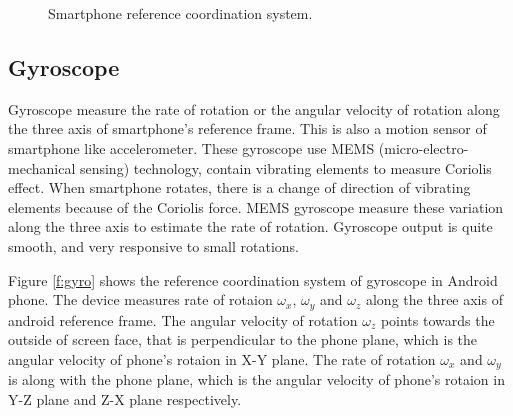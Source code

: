 \begin{figure}[!ht]
\centering
{}
\hfill
{}

\caption{Smartphone reference coordination system.}
\label{f:coord_dia}
\end{figure}

\subsection{Gyroscope}
Gyroscope measure the rate of rotation or the angular velocity of rotation along the three axis of smartphone's reference frame.
This is also a motion sensor of smartphone like accelerometer.
These gyroscope use MEMS (micro-electro-mechanical sensing) technology, contain vibrating elements to measure Coriolis effect.
When smartphone rotates, there is a change of direction of vibrating elements because of the Coriolis force.
MEMS gyroscope measure these variation along the three axis to estimate the rate of rotation.
Gyroscope output is quite smooth, and very responsive to small rotations.

Figure \ref{f:gyro} shows the reference coordination system of gyroscope in Android phone.
The device measures rate of rotaion $\omega_x$, $\omega_y$ and $\omega_z$ along the three axis of android reference frame.
The angular velocity of rotation $\omega_z$ points towards the outside of screen face, that is perpendicular to the phone plane, which is the angular velocity of phone's rotaion in X-Y plane.
The rate of rotation $\omega_x$ and $\omega_y$ is along with the phone plane, which is the angular velocity of phone's rotaion in Y-Z plane and Z-X plane respectively.

